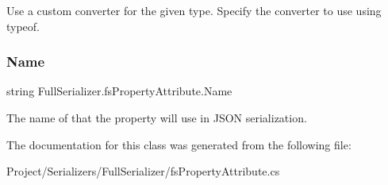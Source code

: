 Use a custom converter for the given type. Specify the converter to use using typeof. 

\mbox{\label{class_full_serializer_1_1fs_property_attribute_ab1b4b66609dc00829628f6d8f07be273}} 
\subsubsection{\texorpdfstring{Name}{Name}}
{\footnotesize\ttfamily string Full\+Serializer.\+fs\+Property\+Attribute.\+Name}



The name of that the property will use in J\+S\+ON serialization. 



The documentation for this class was generated from the following file\+:\begin{DoxyCompactItemize}
\item 
Project/\+Serializers/\+Full\+Serializer/fs\+Property\+Attribute.\+cs\end{DoxyCompactItemize}

